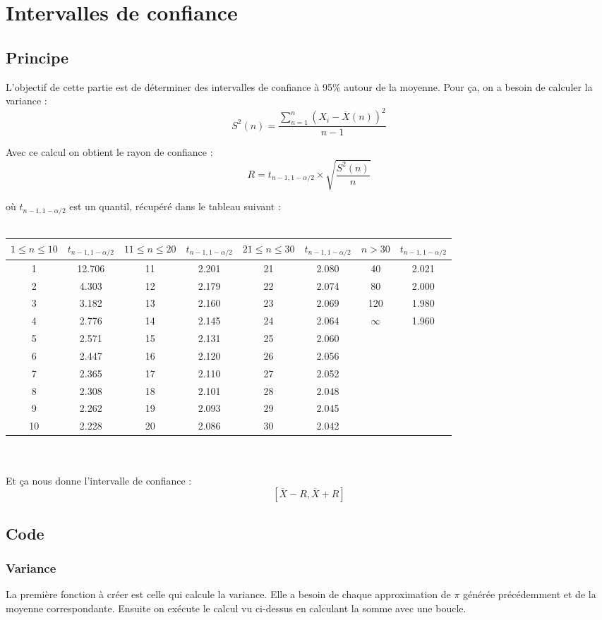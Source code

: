 \documentclass{article}
\begin{document}
\section{Intervalles de confiance}
\subsection{Principe}
L'objectif de cette partie est de déterminer des intervalles de confiance à 95\%
autour de la moyenne. Pour ça, on a besoin de calculer la variance :
$$
S^2(n) = \frac{\sum\limits_{n=1}^{n} (X_i - \overline{X}(n))^2}{n-1}
$$

Avec ce calcul on obtient le rayon de confiance :
$$
R = t_{n-1,1-\alpha/2} \times \sqrt{\frac{S^2(n)}{n}}
$$

où $t_{n-1,1-\alpha/2}$ est un quantil, récupéré dans le tableau suivant :\\\\
\begin{tabular}{|c|c|c|c|c|c|c|c|}
  \hline
  $1 \le n \le 10$ & $t_{n-1,1-\alpha/2}$ & $11 \le n \le 20$ & $t_{n-1,1-\alpha/2}$ & $21 \le n \le 30$ & $t_{n-1,1-\alpha/2}$ & $ n > 30$ & $t_{n-1,1-\alpha/2}$\\
  \hline
  1 & 12.706 & 11 & 2.201 & 21 & 2.080 & 40 & 2.021\\
2 & 4.303 & 12 & 2.179 & 22 & 2.074 & 80 & 2.000\\
3 & 3.182 & 13 & 2.160 & 23 & 2.069 & 120 & 1.980\\
4 & 2.776 & 14 & 2.145 & 24 & 2.064 & $\infty$ & 1.960\\
5 & 2.571 & 15 & 2.131 & 25 & 2.060 & &\\
6 & 2.447 & 16 & 2.120 & 26 & 2.056 & &\\
7 & 2.365 & 17 & 2.110 & 27 & 2.052 & &\\
8 & 2.308 & 18 & 2.101 & 28 & 2.048 & &\\
9 & 2.262 & 19 & 2.093 & 29 & 2.045 & &\\
10 & 2.228 & 20 & 2.086 & 30 & 2.042 & &\\
  \hline
\end{tabular}\\\\
Et ça nous donne l'intervalle de confiance :
$$
[\overline{X} - R, \overline{X} + R]
$$

\subsection{Code}
\subsubsection{Variance}
La première fonction à créer est celle qui calcule la variance. Elle a besoin de chaque
approximation de $\pi$ générée précédemment et de la moyenne correspondante. Ensuite
on exécute le calcul vu ci-dessus en calculant la somme avec une boucle.
\end{document}
